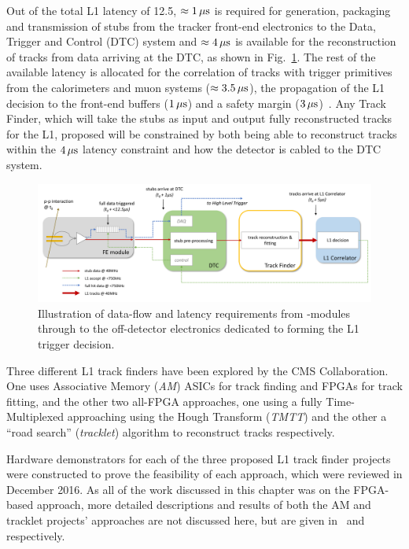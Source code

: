 Out of the total L1 latency of 12.5\mus, $\approx 1\,\mu\text{s}$ is required for generation, packaging and transmission of stubs from the tracker front-end electronics to the Data, Trigger and Control (DTC) system and $\approx 4\,\mu\text{s}$ is available for the reconstruction of tracks from data arriving at the DTC, as shown in Fig.~\ref{fig:dataFlow}.
The rest of the available latency is allocated for the correlation of tracks with trigger primitives from the calorimeters and muon systems ($\approx 3.5\,\mu\text{s}$), the propagation of the L1 decision to the front-end buffers ($1\,\mu\text{s}$) and a safety margin ($3\,\mu\text{s}$)~\cite{CMS_Upgrade_TP}.
Any Track Finder, which will take the stubs as input and output fully reconstructed tracks for the L1, proposed will be constrained by both being able to reconstruct tracks within the $4\,\mu\text{s}$ latency constraint and how the detector is cabled to the DTC system.

\begin{figure}[tb]
\centering
\includegraphics[width=\textwidth]{figs/tk-upgrade/dataflow.pdf}
\caption{Illustration of data-flow and latency requirements from \pt-modules through to the off-detector electronics dedicated to forming the L1 trigger decision.}
\label{fig:dataFlow}
\end{figure}

Three different L1 track finders have been explored by the CMS Collaboration.
One uses Associative Memory (\emph{AM}) ASICs for track finding and FPGAs for track fitting, and the other two all-FPGA approaches, one using a fully Time-Multiplexed approaching using the Hough Transform (\emph{TMTT}) and the other a ``road search'' (\emph{tracklet}) algorithm to reconstruct tracks respectively.

Hardware demonstrators for each of the three proposed L1 track finder projects were constructed to prove the feasibility of each approach, which were reviewed in December 2016.
As all of the work discussed in this chapter was on the FPGA-based \HT approach, more detailed descriptions and results of both the AM and tracklet projects' approaches are not discussed here, but are given in~\cite{AM,P2TrackerTDR} and~\cite{tracklet,P2TrackerTDR} respectively.

